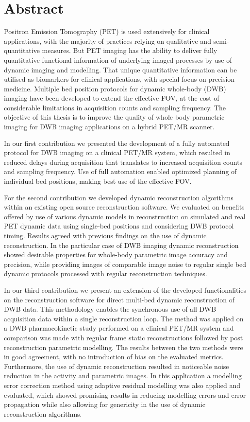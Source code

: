 \section*{Abstract}
Positron Emission Tomography (PET) is used extensively for clinical applications, with the majority of practices relying on qualitative and semi-quantitative measures. But PET imaging has the ability to deliver fully quantitative functional information of underlying imaged processes by use of dynamic imaging and modelling. That unique quantitative information can be utilised as biomarkers for clinical applications, with special focus on precision medicine. Multiple bed position protocols for dynamic whole-body (DWB) imaging have been developed to extend the effective FOV, at the cost of considerable limitations in acquisition counts and sampling frequency. The objective of this thesis is to improve the quality of whole body parametric imaging for DWB imaging applications on a hybrid PET/MR scanner.

In our first contribution we presented the development of a fully automated protocol for DWB imaging on a clinical PET/MR system, which resulted in reduced delays during acquisition that translates to increased acquisition counts and sampling frequency. Use of full automation enabled optimized planning of individual bed positions, making best use of the effective FOV. 

For the second contribution we developed dynamic reconstruction algorithms within an existing open source reconstruction software. We evaluated on benefits offered by use of various dynamic models in reconstruction on simulated and real PET dynamic data using single-bed positions and considering DWB protocol timing.
Results agreed with previous findings on the use of dynamic reconstruction. In the particular case of DWB imaging dynamic reconstruction showed desirable properties for whole-body parametric image accuracy and precision, while providing images of comparable image noise to regular single bed dynamic protocols processed with regular reconstruction techniques.

In our third contribution we present an extension of the developed functionalities on the reconstruction software for direct multi-bed dynamic reconstruction of DWB data. This methodology enables the synchronous use of all DWB acquisition data within a single reconstruction loop. The method was applied on a DWB pharmacokinetic study performed on a clinical PET/MR system and comparison was made with regular frame static reconstructions followed by post reconstruction parametric modelling. The results between the two methods were in good agreement, with no introduction of bias on the evaluated metrics. Furthermore, the use of dynamic reconstruction resulted in noticeable noise reduction in the activity and parametric images. In this application a modelling error correction method using adaptive residual modelling was also applied and evaluated, which showed promising results in reducing modelling errors and error propagation while also allowing for genericity in the use of dynamic reconstruction algorithms.

